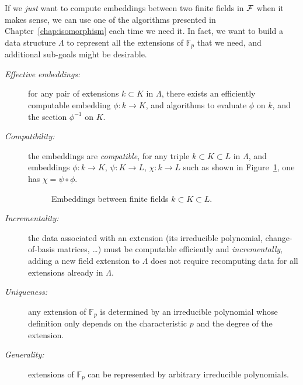 If we \emph{just} want to compute embeddings between two finite
fields in $\mathcal{F}$ when it makes sense, we can use one of the algorithms presented
in Chapter~\ref{chap:isomorphism} each time we need it. In fact, we want to
build a data structure $\Lambda$ to represent all the extensions of
$\mathbb{F}_p$ that we need, and additional sub-goals might be desirable.
\begin{description}
\item[\emph{Effective embeddings:}] for any pair of extensions
  $k\subset K$ in $\Lambda$, there exists an efficiently computable
  embedding $\phi:k\to K$, and algorithms to evaluate $\phi$ on $k$,
  and the section $\phi^{-1}$ on $K$.
\item[\emph{Compatibility:}] the embeddings are \emph{compatible},
  \ie for any triple $k\subset K\subset L$ in $\Lambda$, and
  embeddings $\phi:k\to K$, $\psi:K\to L$, $\chi:k\to L$ such as shown in
  Figure~\ref{fig:compatibility}, one has
  $\chi=\psi\circ\phi$.
  \begin{figure}[h]
    \centering

  \caption{Embeddings between finite fields $k\subset K\subset L$.}
  \label{fig:compatibility}
  \end{figure}
\item[\emph{Incrementality:}] the data associated with an extension
  (\eg its irreducible polynomial, change-of-basis matrices, \dots)
  must be computable efficiently and \emph{incrementally}, \ie 
  adding a new field extension to $\Lambda$ does not require
  recomputing data for all extensions already in $\Lambda$.
\item[\emph{Uniqueness:}] any extension of $\mathbb{F}_{p}$ is determined by an
  irreducible polynomial whose definition only depends on the
  characteristic $p$ and the degree of the extension.
\item[\emph{Generality:}] extensions of $\mathbb{F}_{p}$ can be represented by
  arbitrary irreducible polynomials.
\end{description}
